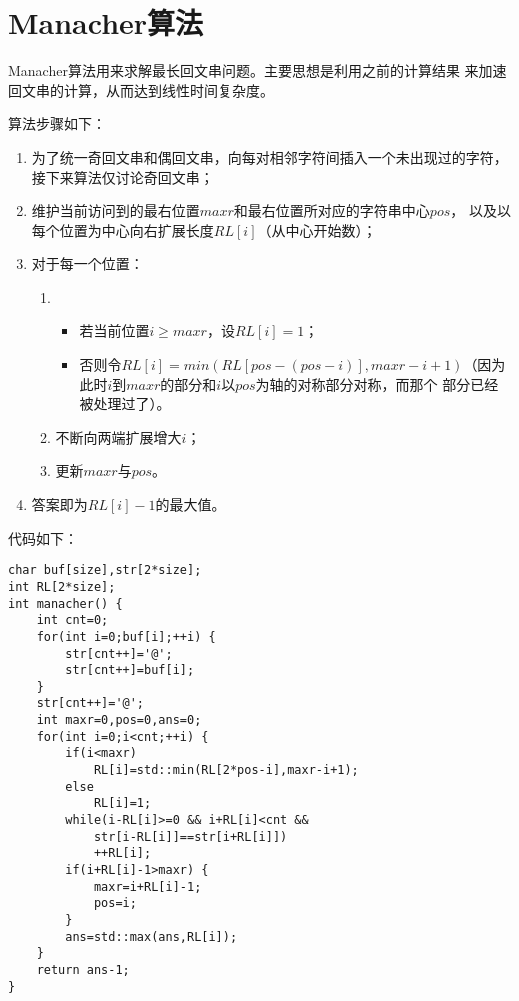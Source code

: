 \section{Manacher算法}
Manacher算法用来求解最长回文串问题。主要思想是利用之前的计算结果
来加速回文串的计算，从而达到线性时间复杂度。

算法步骤如下：
\begin{enumerate}
    \item 为了统一奇回文串和偶回文串，向每对相邻字符间插入一个未出现过的字符，
    接下来算法仅讨论奇回文串；
    \item 维护当前访问到的最右位置$maxr$和最右位置所对应的字符串中心$pos$，
    以及以每个位置为中心向右扩展长度$RL[i]$（从中心开始数）；
    \item 对于每一个位置：
    \begin{enumerate}
        \item
        \begin{itemize}
            \item 若当前位置$i\geq maxr$，设$RL[i]=1$；
            \item 否则令$RL[i]=min(RL[pos-(pos-i)],maxr-i+1)$（因为
            此时$i$到$maxr$的部分和$i$以$pos$为轴的对称部分对称，而那个
            部分已经被处理过了）。
        \end{itemize}
        \item 不断向两端扩展增大$i$；
        \item 更新$maxr$与$pos$。
    \end{enumerate}
    \item 答案即为$RL[i]-1$的最大值。
\end{enumerate}

代码如下：
\begin{lstlisting}
char buf[size],str[2*size];
int RL[2*size];
int manacher() {
    int cnt=0;
    for(int i=0;buf[i];++i) {
        str[cnt++]='@';
        str[cnt++]=buf[i];
    }
    str[cnt++]='@';
    int maxr=0,pos=0,ans=0;
    for(int i=0;i<cnt;++i) {
        if(i<maxr)
            RL[i]=std::min(RL[2*pos-i],maxr-i+1);
        else
            RL[i]=1;
        while(i-RL[i]>=0 && i+RL[i]<cnt &&
            str[i-RL[i]]==str[i+RL[i]])
            ++RL[i];
        if(i+RL[i]-1>maxr) {
            maxr=i+RL[i]-1;
            pos=i;
        }
        ans=std::max(ans,RL[i]);
    }
    return ans-1;
}
\end{lstlisting}

